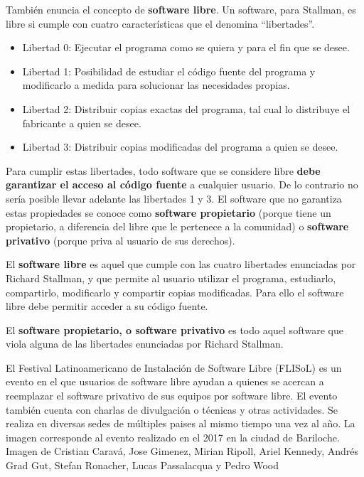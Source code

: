 También enuncia el concepto de \textbf{software libre}. Un software, para
Stallman, es libre si cumple con cuatro características que el denomina
``libertades''.
\begin{itemize}
    \item Libertad 0: Ejecutar el programa como se quiera y para el fin que se
    desee.
    \item Libertad 1: Posibilidad de estudiar el código fuente del programa y
    modificarlo a medida para solucionar las necesidades propias.
    \item Libertad 2: Distribuir copias exactas del programa, tal cual lo
    distribuye el fabricante a quien se desee.
    \item Libertad 3: Distribuir copias modificadas del programa a quien se
    desee.
\end{itemize}

Para cumplir estas libertades, todo software que se considere libre \textbf{debe
garantizar el acceso al código fuente} a cualquier usuario. De lo contrario no
sería posible llevar adelante las libertades 1 y 3. El software que no garantiza
estas propiedades se conoce como \textbf{software propietario} (porque tiene un
propietario, a diferencia del libre que le pertenece a la comunidad) o
\textbf{software privativo} (porque priva al usuario de sus
derechos).\autocite{stallman_2009}

\begin{definition} El \textbf{software libre} es aquel que
    cumple con las cuatro libertades enunciadas por Richard Stallman, y que
    permite al usuario utilizar el programa, estudiarlo, compartirlo,
    modificarlo y compartir copias modificadas. Para ello el software libre debe
    permitir acceder a su código fuente.
\end{definition}

\begin{definition} El
    \textbf{software propietario, o software privativo} es todo aquel software
    que viola alguna de las libertades enunciadas por Richard Stallman.
\end{definition}

{El Festival Latinoamericano de Instalación de Software Libre (FLISoL) es un
evento en el que usuarios de software libre ayudan a quienes se acercan a
reemplazar el software privativo de sus equipos por software libre. El evento
también cuenta con charlas de divulgación o técnicas y otras actividades. Se
realiza en diversas sedes de múltiples paises al mismo tiempo una vez al año. La
imagen corresponde al evento realizado en el 2017 en la ciudad de Bariloche.}
{Imagen de Cristian Caravá, Jose Gimenez, Mirian Ripoll, Ariel Kennedy, Andrés
Grad Gut, Stefan Ronacher, Lucas Passalacqua y Pedro Wood}

